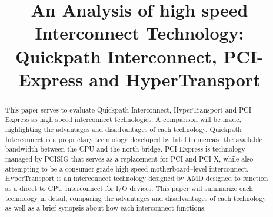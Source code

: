 \documentclass[conference]{IEEEtran}
\begin{document}
%
\title{An Analysis of high speed Interconnect Technology: Quickpath
Interconnect, PCI-Express and HyperTransport}


\author{
}

\maketitle


\begin{abstract}
\label{sec:abstract}
This paper serves to evaluate Quickpath Interconnect, HyperTransport and PCI
Express as high speed interconnect technologies. A comparison will be made,
highlighting the advantages and disadvantages of each technology. Quickpath
Interconnect is a proprietary technology developed by Intel to increase the
available bandwidth between the CPU and the north bridge. PCI-Express is
technology managed by PCISIG that serves as a replacement for PCI and PCI-X,
while also attempting to be a consumer grade high speed motherboard--level
interconnect. HyperTransport is an interconnect technology designed by AMD
designed to function as a direct to CPU interconnect for I/O devices. This paper
will summarize each technology in detail, comparing the advantages and
disadvantages of each technology as well as a brief synopsis about how each
interconnect functions. 
\end{abstract}





%
\IEEEpeerreviewmaketitle
\end{document}
